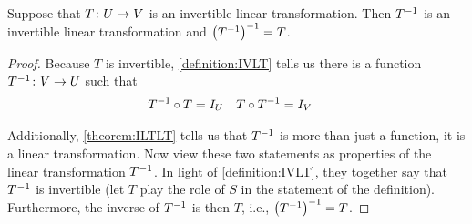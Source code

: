 \documentclass{ximera}
\begin{document}
\begin{theorem}
\label{theorem:IILT}


Suppose that $T\colon U\rightarrow V$ is an invertible linear transformation.  Then $T^{-1}$ is an invertible linear transformation and $\left(T^{-1}\right)^{-1}=T$.





\begin{proof}
Because $T$ is invertible, \ref{definition:IVLT} tells us there is a function $T^{-1}\colon V\rightarrow U$ such that
\begin{align*}
{T^{-1}}\circ{T}&=I_U & {T}\circ{T^{-1}}&=I_V
\end{align*}




Additionally, \ref{theorem:ILTLT} tells us that $T^{-1}$ is more than just a function, it is a linear transformation.  Now view these two statements as properties of the linear transformation $T^{-1}$.  In light of \ref{definition:IVLT}, they together say that $T^{-1}$ is invertible (let $T$ play the role of $S$ in the statement of the definition).  Furthermore, the inverse of $T^{-1}$ is then $T$, i.e.,  $\left(T^{-1}\right)^{-1}=T$.



\end{proof}
\end{theorem}
\end{document}
